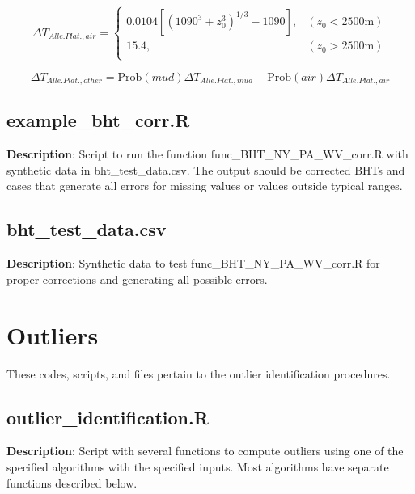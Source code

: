 \documentclass[12pt,a4paper]{article}
\begin{document}
\begin{equation} \label{AP_air}
{\Delta T}_{Alle. Plat., air} =  \left\{
\begin{array}{ll}
0.0104\left[ \left(1090^3 + z_0^3\right)^{1/3} -1090 \right],	& (z_0 < 2500 \mathrm{m})\\
15.4,  & (z_0 > 2500\mathrm{m})\\
\end{array} \right .
\end{equation}

\begin{equation} \label{AP_oth}
{\Delta T}_{Alle. Plat., other} = \mathrm{Prob}(mud) {\Delta T}_{Alle. Plat., mud} + \mathrm{Prob}(air){\Delta T}_{Alle. Plat., air}
\end{equation}


\subsection*{\textsf{example\_bht\_corr.R}}

\textbf{Description}: Script to run the function \textsf{func\_BHT\_NY\_PA\_WV\_corr.R} with synthetic data in \textsf{bht\_test\_data.csv}. The output should be corrected BHTs and cases that generate all errors for missing values or values outside typical ranges.

\subsection*{\textsf{bht\_test\_data.csv}}

\textbf{Description}: Synthetic data to test \textsf{func\_BHT\_NY\_PA\_WV\_corr.R} for proper corrections and generating all possible errors.

\newpage

\section*{Outliers}
These codes, scripts, and files pertain to the outlier identification procedures.

\subsection*{\textsf{outlier\_identification.R}}

\textbf{Description}: Script with several functions to compute outliers using one of the specified algorithms with the specified inputs. Most algorithms have separate functions described below.
\end{document}
